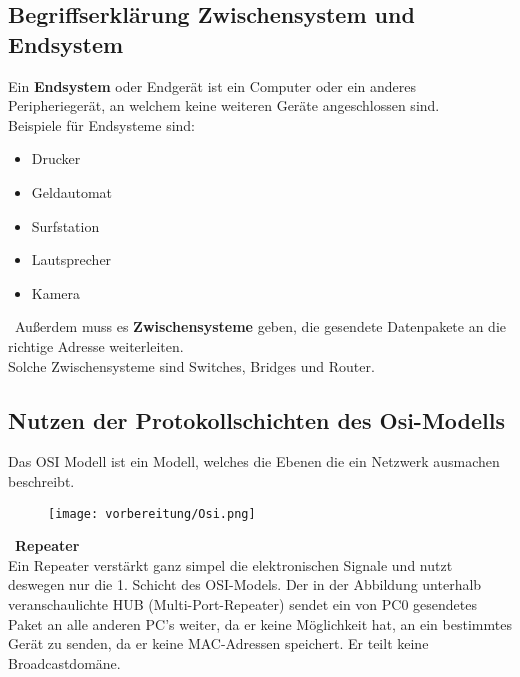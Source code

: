 \subsection{Begriffserklärung Zwischensystem und Endsystem}

    Ein \textbf{Endsystem} oder Endgerät ist ein Computer oder ein anderes Peripheriegerät, an welchem keine weiteren Geräte angeschlossen sind. \\
    Beispiele für Endsysteme sind:
    \begin{itemize}
        \item Drucker
        \item Geldautomat
        \item Surfstation
        \item Lautsprecher
        \item Kamera
    \end{itemize}
    \
    Außerdem muss es \textbf{Zwischensysteme} geben, die gesendete Datenpakete an die richtige Adresse weiterleiten. \\
    Solche Zwischensysteme sind Switches, Bridges und Router. 


\subsection{Nutzen der Protokollschichten des Osi-Modells}

    Das OSI Modell ist ein Modell, welches die Ebenen die ein Netzwerk ausmachen beschreibt.

    

    \begin{figure}[H]
        \centering
        \texttt{[image: vorbereitung/Osi.png]}
    \end{figure}
    \
    \textbf{Repeater}
    \\
    Ein Repeater verstärkt ganz simpel die elektronischen Signale und nutzt deswegen nur die 1. Schicht des OSI-Models. Der in der Abbildung unterhalb veranschaulichte HUB (Multi-Port-Repeater) sendet ein von PC0 gesendetes Paket an alle anderen PC’s weiter, da er keine Möglichkeit hat, an ein bestimmtes Gerät zu senden, da er keine MAC-Adressen speichert. Er teilt keine Broadcastdomäne.\\

